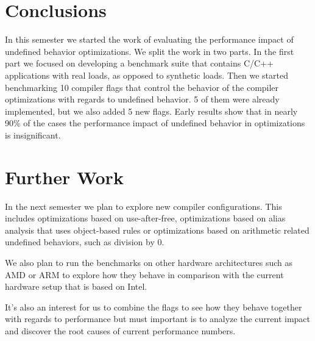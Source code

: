 \section{Conclusions} \label{sec:ccl}

In this semester we started the work of evaluating the performance impact of
undefined behavior optimizations. We split the work in two parts. In the first
part we focused on developing a benchmark suite that contains C/C++ applications
with real loads, as opposed to synthetic loads. Then we started benchmarking 10
compiler flags that control the behavior of the compiler optimizations with
regards to undefined behavior. 5 of them were already implemented, but we also
added 5 new flags. Early results show that in nearly 90\% of the cases the
performance impact of undefined behavior in optimizations is insignificant.

\section{Further Work} \label{sec:further-work}

In the next semester we plan to explore new compiler configurations. This
includes optimizations based on use-after-free, optimizations based on alias
analysis that uses object-based rules or optimizations based on arithmetic
related undefined behaviors, such as division by 0.

We also plan to run the benchmarks on other hardware architectures such as AMD
or ARM to explore how they behave in comparison with the current hardware setup
that is based on Intel.

It's also an interest for us to combine the flags to see how they behave
together with regards to performance but must important is to analyze the
current impact and discover the root causes of current performance numbers.
